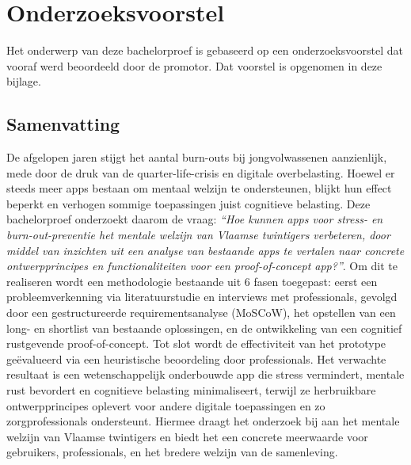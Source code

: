 \documentclass[dutch,dit,thesis]{hogentreport}
\begin{document}
    
    
    
    
    
    
    
    
    
    
    
    
    
    \appendix
    
    \chapter{Onderzoeksvoorstel}
    
    Het onderwerp van deze bachelorproef is gebaseerd op een onderzoeksvoorstel dat vooraf werd beoordeeld door de promotor. Dat voorstel is opgenomen in deze bijlage.
    
    \section*{Samenvatting}
    
    De afgelopen jaren stijgt het aantal burn-outs bij jongvolwassenen aanzienlijk, mede door de druk van de quarter-life-crisis en digitale overbelasting. Hoewel er steeds meer apps bestaan om mentaal welzijn te ondersteunen, blijkt hun effect beperkt en verhogen sommige toepassingen juist cognitieve belasting. Deze bachelorproef onderzoekt daarom de vraag: \emph{“Hoe kunnen apps voor stress- en burn-out-preventie het mentale welzijn van Vlaamse twintigers verbeteren, door middel van inzichten uit een analyse van bestaande apps te vertalen naar concrete ontwerpprincipes en functionaliteiten voor een proof-of-concept app?”}. Om dit te realiseren wordt een methodologie bestaande uit 6 fasen toegepast: eerst een probleemverkenning via literatuurstudie en interviews met professionals, gevolgd door een gestructureerde requirementsanalyse (MoSCoW), het opstellen van een long- en shortlist van bestaande oplossingen, en de ontwikkeling van een cognitief rustgevende proof-of-concept. Tot slot wordt de effectiviteit van het prototype geëvalueerd via een heuristische beoordeling door professionals. Het verwachte resultaat is een wetenschappelijk onderbouwde app die stress vermindert, mentale rust bevordert en cognitieve belasting minimaliseert, terwijl ze herbruikbare ontwerpprincipes oplevert voor andere digitale toepassingen en zo zorgprofessionals ondersteunt. Hiermee draagt het onderzoek bij aan het mentale welzijn van Vlaamse twintigers en biedt het een concrete meerwaarde voor gebruikers, professionals, en het bredere welzijn van de samenleving.
    
\end{document}
